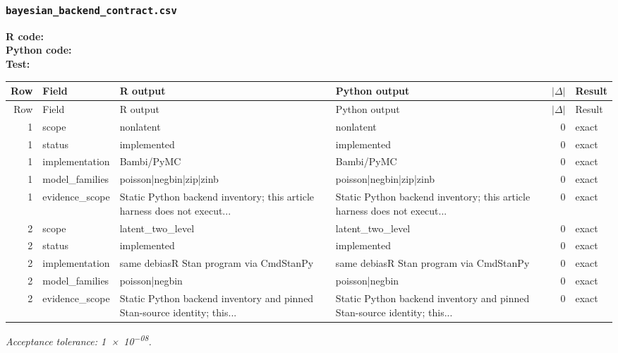 \documentclass[10pt]{article}
\begin{document}
\subsubsection{\texorpdfstring{\texttt{bayesian\_backend\_contract.csv}}{bayesian\_backend\_contract.csv}}
{\footnotesize \textbf{R code:} \\ \textbf{Python code:} \\ \textbf{Test:} \par}

\small
\begin{longtable}{@{}r p{}p{}p{}rl@{}}
\toprule
Row & Field & R output & Python output & $|\Delta|$ & Result \\
\midrule
\endfirsthead
\toprule
Row & Field & R output & Python output & $|\Delta|$ & Result \\
\midrule
\endhead
1 & scope & nonlatent & nonlatent & 0 & exact \\
1 & status & implemented & implemented & 0 & exact \\
1 & implementation & Bambi/\allowbreak{}PyMC & Bambi/\allowbreak{}PyMC & 0 & exact \\
1 & model\_\allowbreak{}families & poisson|negbin|zip|zinb & poisson|negbin|zip|zinb & 0 & exact \\
1 & evidence\_\allowbreak{}scope & Static Python backend inventory; this article harness does not execut... & Static Python backend inventory; this article harness does not execut... & 0 & exact \\
2 & scope & latent\_\allowbreak{}two\_\allowbreak{}level & latent\_\allowbreak{}two\_\allowbreak{}level & 0 & exact \\
2 & status & implemented & implemented & 0 & exact \\
2 & implementation & same debiasR Stan program via CmdStanPy & same debiasR Stan program via CmdStanPy & 0 & exact \\
2 & model\_\allowbreak{}families & poisson|negbin & poisson|negbin & 0 & exact \\
2 & evidence\_\allowbreak{}scope & Static Python backend inventory and pinned Stan-source identity; this... & Static Python backend inventory and pinned Stan-source identity; this... & 0 & exact \\
\bottomrule
\end{longtable}
\normalsize
\textit{Acceptance tolerance: \num{1e-08}.}
\end{document}
